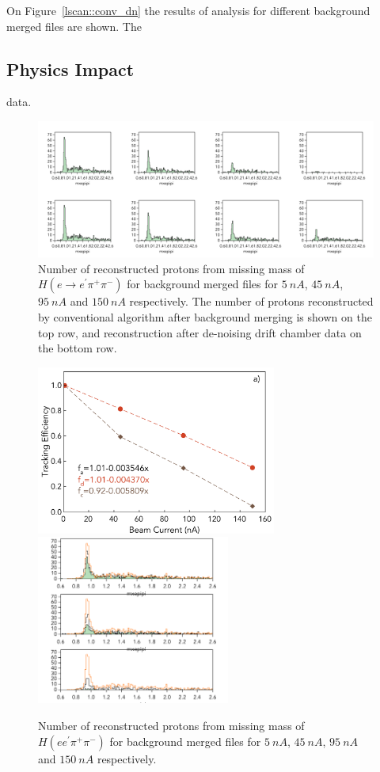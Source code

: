 On Figure~\ref{lscan::conv_dn} the results of analysis for different background merged files are shown. The 

\subsection{Physics Impact}

data.

\begin{figure}[!ht]
\begin{center}
 \includegraphics[width=6.1in]{images/figure_phys_conv.pdf}
\caption {Number of reconstructed protons from missing mass of $H(e \rightarrow e^\prime \pi^+\pi^-)$ for background 
merged files for  $5~nA$, $45~nA$, $95~nA$ and $150~nA$ respectively. The number of protons reconstructed by 
conventional algorithm after background merging is shown on the top row, and reconstruction after  de-noising drift 
chamber data on the bottom row.}
 \label{physics::conv_dn}
 \end{center}
\end{figure}


\begin{figure}[!ht]
\begin{center}
 \includegraphics[width=3.1in]{images/figure_phys_scan.pdf}
 \includegraphics[width=2.5in]{images/figure_phys_conv_compare.pdf}
\caption {Number of reconstructed protons from missing mass 
of $H(e e^\prime \pi^+\pi^-)$ for background merged files for 
$5~nA$, $45~nA$, $95~nA$ and $150~nA$ respectively.}
 \label{physics::conv_dn}
 \end{center}
\end{figure}

